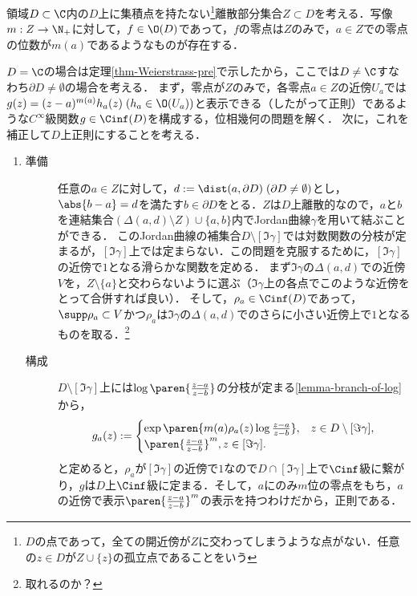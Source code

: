 \documentclass[uplatex, dvipdfmx]{jsreport}
\begin{document}
\begin{theorem}[Weierstrass]\label{thm-Weierstrass-zero}
    領域$D\subset\C$内の$D$上に集積点を持たない\footnote{$D$の点であって，全ての開近傍が$Z$に交わってしまうような点がない．任意の$z\in D$が$Z\cup\{z\}$の孤立点であることをいう}離散部分集合$Z\subset D$を考える．写像$m:Z\to\N_+$に対して，$f\in\O(D)$であって，$f$の零点は$Z$のみで，$a\in Z$での零点の位数が$m(a)$であるようなものが存在する．
\end{theorem}
\begin{Proof}
    $D=\C$の場合は定理\ref{thm-Weierstrass-pre}で示したから，ここでは$D\ne\C$すなわち$\partial D\ne\emptyset$の場合を考える．
    まず，零点が$Z$のみで，各零点$a\in Z$の近傍$U_a$では$g(z)=(z-a)^{m(a)}h_a(z)\;(h_a\in\O(U_a))$と表示できる（したがって正則）であるような$C^\infty$級関数$g\in\Cinf(D)$を構成する，位相幾何の問題を解く．
    次に，これを補正して$D$上正則にすることを考える．
    \begin{enumerate}
        \item 
    \begin{description}
        \item[準備] 任意の$a\in Z$に対して，$d:=\dist(a,\partial D)\;(\partial D\ne\emptyset)$とし，$\abs{b-a}=d$を満たす$b\in\partial D$をとる．$Z$は$D$上離散的なので，$a$と$b$を連結集合$(\Delta(a,d)\setminus Z)\cup\{a,b\}$内でJordan曲線$\gamma$を用いて結ぶことができる．
        このJordan曲線の補集合$D\setminus[\Im\gamma]$では対数関数の分枝が定まるが，$[\Im\gamma]$上では定まらない．この問題を克服するために，$[\Im\gamma]$の近傍で$1$となる滑らかな関数を定める．
        まず$\Im\gamma$の$\Delta(a,d)$での近傍$V$を，$Z\setminus\{a\}$と交わらないように選ぶ（$\Im\gamma$上の各点でこのような近傍をとって合併すれば良い）．
        そして，$\rho_a\in\Cinf(D)$であって，$\supp\rho_a\subset V$かつ$\rho_a$は$\Im\gamma$の$\Delta(a,d)$でのさらに小さい近傍上で$1$となるものを取る．\footnote{取れるのか？}
        \item[構成]
        $D\setminus[\Im\gamma]$上には$\log\paren{\frac{z-a}{z-b}}$の分枝が定まる\ref{lemma-branch-of-log}から，
        \[g_a(z):=\begin{cases}
        \exp\paren{m(a)\rho_a(z)\log\frac{z-a}{z-b}},&z\in D\setminus[\Im\gamma],\\
        \paren{\frac{z-a}{z-b}}^m,z\in[\Im\gamma].
        \end{cases}\]
        と定めると，$\rho_a$が$[\Im\gamma]$の近傍で$1$なので$D\cap[\Im\gamma]$上で$\Cinf$級に繋がり，$g$は$D$上$\Cinf$級に定まる．そして，$a$にのみ$m$位の零点をもち，$a$の近傍で表示$\paren{\frac{z-a}{z-b}}^m$の表示を持つわけだから，正則である．

\end{description}
\end{enumerate}
\end{Proof}
\end{document}
